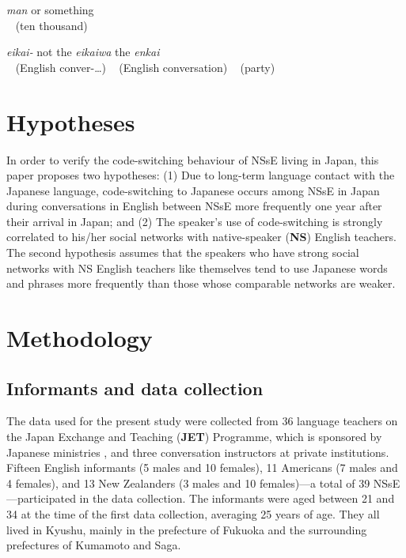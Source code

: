\documentclass[output=paper]{LSP/langsci}
\begin{document}
\ea
{} {\textit{man}} {or something}\\
{~} {(ten thousand)} {~}\\
\z


\ea
{} {\textit{eikai-}}  {not the} {\textit{eikaiwa}}  {the} {\textit{enkai}} \\
{~} {(English conver-\ldots)} {~} {(English conversation)} {~} {(party)}\\
\z


\section{Hypotheses}
In order to verify the code-switching behaviour of NSsE living in Japan, this paper proposes two hypotheses: (1) Due to long-term language contact with the Japanese language, code-switching to Japanese occurs among NSsE in Japan during conversations in English between NSsE more frequently one year after their arrival in Japan; and (2) The speaker’s use of code-switching is strongly correlated to his/her social networks with native-speaker (\textbf{NS}) English teachers. The second hypothesis assumes that the speakers who have strong social networks with NS English teachers like themselves tend to use Japanese words and phrases more frequently than those whose comparable networks are weaker.

\section{Methodology}
\subsection{Informants and data collection}
The data used for the present study were collected from 36 language teachers on the Japan Exchange and Teaching (\textbf{JET}) Programme, which is sponsored by Japanese ministries \citep{council_of_local_authorities_for_international_relations_[clair]_jet_2013}, and three conversation instructors at private institutions. Fifteen English informants (5 males and 10 females), 11 Americans (7 males and 4 females), and 13 New Zealanders (3 males and 10 females)—a total of 39 NSsE—participated in the data collection. The informants were aged between 21 and 34 at the time of the first data collection, averaging 25 years of age. They all lived in Kyushu, mainly in the prefecture of Fukuoka and the surrounding prefectures of Kumamoto and Saga.
\end{document}
